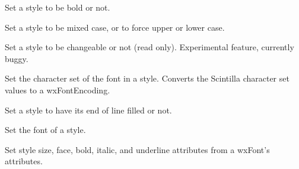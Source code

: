 Set a style to be bold or not.


\label{wxstyledtextctrlstylesetcase}


Set a style to be mixed case, or to force upper or lower case.


\label{wxstyledtextctrlstylesetchangeable}


Set a style to be changeable or not (read only).
Experimental feature, currently buggy.


\label{wxstyledtextctrlstylesetcharacterset}


Set the character set of the font in a style.  Converts the Scintilla
character set values to a wxFontEncoding.


\label{wxstyledtextctrlstyleseteolfilled}


Set a style to have its end of line filled or not.


\label{wxstyledtextctrlstylesetfacename}


Set the font of a style.


\label{wxstyledtextctrlstylesetfont}


Set style size, face, bold, italic, and underline attributes from
a wxFont's attributes.


\label{wxstyledtextctrlstylesetfontattr}


